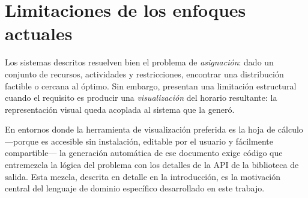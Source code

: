 \section{Limitaciones de los enfoques actuales}
\label{sec:limitaciones-arte}

Los sistemas descritos resuelven bien el problema de \emph{asignación}: dado
un conjunto de recursos, actividades y restricciones, encontrar una
distribución factible o cercana al óptimo.  Sin embargo, presentan una
limitación estructural cuando el requisito es producir una
\emph{visualización} del horario resultante: la representación visual queda
acoplada al sistema que la generó.

En entornos donde la herramienta de visualización preferida es la hoja de
cálculo ---porque es accesible sin instalación, editable por el usuario y
fácilmente compartible--- la generación automática de ese documento exige
código que entremezcla la lógica del problema con los detalles de la API de
la biblioteca de salida.  Esta mezcla, descrita en detalle en la
introducción, es la motivación central del lenguaje de dominio específico
desarrollado en este trabajo.

